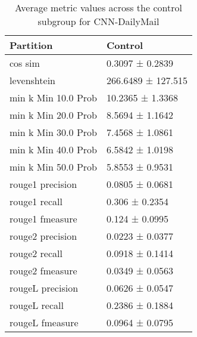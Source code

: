 \begin{table}
\caption{Average metric values across the control subgroup for CNN-DailyMail}
\label{tab:}
\begin{tabular}{ll}
\toprule
Partition & Control \\
\midrule
cos sim & 0.3097 ± 0.2839 \\
levenshtein & 266.6489 ± 127.515 \\
min k Min 10.0 Prob & 10.2365 ± 1.3368 \\
min k Min 20.0 Prob & 8.5694 ± 1.1642 \\
min k Min 30.0 Prob & 7.4568 ± 1.0861 \\
min k Min 40.0 Prob & 6.5842 ± 1.0198 \\
min k Min 50.0 Prob & 5.8553 ± 0.9531 \\
rouge1 precision & 0.0805 ± 0.0681 \\
rouge1 recall & 0.306 ± 0.2354 \\
rouge1 fmeasure & 0.124 ± 0.0995 \\
rouge2 precision & 0.0223 ± 0.0377 \\
rouge2 recall & 0.0918 ± 0.1414 \\
rouge2 fmeasure & 0.0349 ± 0.0563 \\
rougeL precision & 0.0626 ± 0.0547 \\
rougeL recall & 0.2386 ± 0.1884 \\
rougeL fmeasure & 0.0964 ± 0.0795 \\
\bottomrule
\end{tabular}
\end{table}
